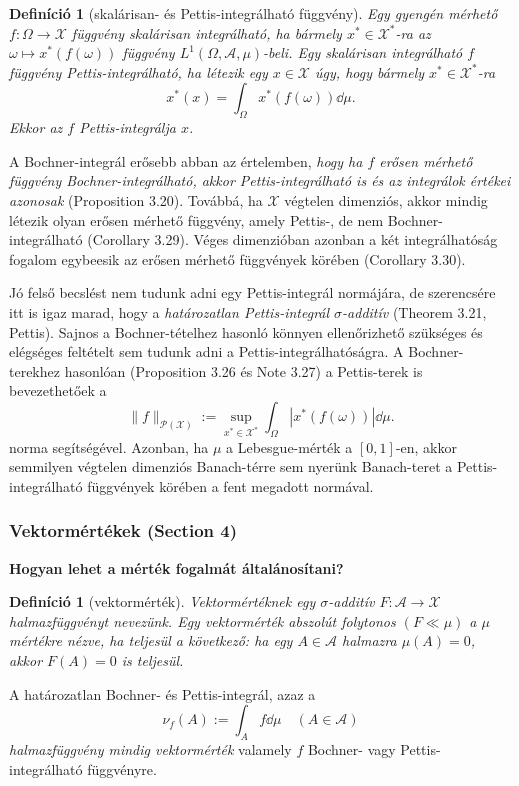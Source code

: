 \documentclass{beamer} %
\newtheorem{defi}[lem]{Definíció}
\begin{document}
\begin{frame}
\justifying
\begin{defi}[skalárisan- és Pettis-integrálható függvény] Egy gyengén mérhető $f \colon \Omega \to \mathcal{X}$ függvény skalárisan integrálható, ha bármely $x^* \in \mathcal{X}^*$-ra az $\omega \mapsto x^*(f(\omega))$ függvény $L^1(\Omega, \mathcal{A},\mu)$-beli. Egy skalárisan integrálható $f$ függvény Pettis-integrálható, ha létezik egy $x \in \mathcal{X}$ úgy, hogy bármely $x^* \in \mathcal{X}^*$-ra
$$x^*(x) = \int_{\Omega} x^*(f(\omega))\dd{\mu}.$$
Ekkor az $f$ Pettis-integrálja $x$.
\end{defi}
\pause A Bochner-integrál erősebb abban az értelemben, \textit{hogy ha $f$ erősen mérhető függvény Bochner-integrálható, akkor Pettis-integrálható is és az integrálok értékei azonosak} (Proposition 3.20). \pause Továbbá, ha $\mathcal{X}$ végtelen dimenziós, akkor mindig létezik olyan erősen mérhető függvény, amely Pettis-, de nem Bochner-integrálható (Corollary 3.29). \pause Véges dimenzióban azonban a két integrálhatóság fogalom egybeesik az erősen mérhető függvények körében (Corollary 3.30).
\end{frame}

\begin{frame}
\justifying
\pause Jó felső becslést nem tudunk adni egy Pettis-integrál normájára, \pause de szerencsére itt is igaz marad, hogy a \textit{határozatlan Pettis-integrál $\sigma$-additív} (Theorem 3.21, Pettis). \pause Sajnos a Bochner-tételhez hasonló könnyen ellenőrizhető szükséges és elégséges feltételt sem tudunk adni a Pettis-integrálhatóságra.
\pause A Bochner-terekhez hasonlóan (Proposition 3.26 és Note 3.27) a Pettis-terek is bevezethetőek a
\pause $$
\|f\|_{\mathcal{P}(\mathcal{X})} := \sup_{x^* \in \mathcal{X}^*} \int_{\Omega} | x^*(f(\omega)) | \dd{\mu}.
$$
norma segítségével. \pause Azonban, ha $\mu$ a Lebesgue-mérték a $[0,1]$-en, akkor semmilyen végtelen dimenziós Banach-térre sem nyerünk Banach-teret a Pettis-integrálható függvények körében a fent megadott normával.
\end{frame}

\begin{frame}
\justifying
\frametitle{Vektormértékek (Section 4)}
\textbf{Hogyan lehet a mérték fogalmát általánosítani?}
\pause \begin{defi}[vektormérték]Vektormértéknek egy $\sigma$-additív  $F \colon \mathcal{A} \to \mathcal{X}$ halmazfüggvényt nevezünk. Egy vektormérték abszolút folytonos $(F \ll \mu)$ a $\mu$ mértékre nézve, ha teljesül a következő: ha egy $A \in \mathcal{A}$ halmazra $\mu(A) = 0$, akkor $F(A)=0$ is teljesül.
\end{defi}
\pause A határozatlan Bochner- és Pettis-integrál, azaz a 
$$\nu_f(A) := \int_{A} f \dd{\mu} \quad (A \in \mathcal{A})$$
\textit{halmazfüggvény mindig vektormérték} valamely $f$ Bochner- vagy Pettis-integrálható függvényre.
\end{frame}
\end{document}

